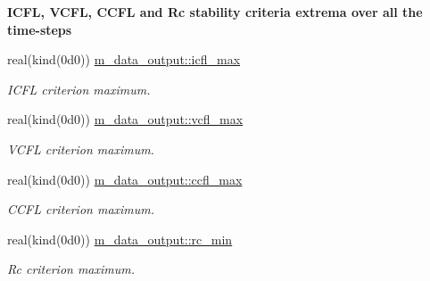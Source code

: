 \begin{Indent}\textbf{ I\+C\+FL, V\+C\+FL, C\+C\+FL and Rc stability criteria extrema over all the time-\/steps}\par
\begin{DoxyCompactItemize}
\item 
real(kind(0d0)) \hyperlink{namespacem__data__output_a08a5f85ca151336658398a0eccc93cb4}{m\+\_\+data\+\_\+output\+::icfl\+\_\+max}
\begin{DoxyCompactList}\small\item\em I\+C\+FL criterion maximum. \end{DoxyCompactList}\item 
real(kind(0d0)) \hyperlink{namespacem__data__output_ada9b22b5a158b2ce980f43cec00a1ac6}{m\+\_\+data\+\_\+output\+::vcfl\+\_\+max}
\begin{DoxyCompactList}\small\item\em V\+C\+FL criterion maximum. \end{DoxyCompactList}\item 
real(kind(0d0)) \hyperlink{namespacem__data__output_afc429263f629a2ba4b5655dec5fd2509}{m\+\_\+data\+\_\+output\+::ccfl\+\_\+max}
\begin{DoxyCompactList}\small\item\em C\+C\+FL criterion maximum. \end{DoxyCompactList}\item 
real(kind(0d0)) \hyperlink{namespacem__data__output_adb7a215382fddf4e405b97cd2f1ddf0d}{m\+\_\+data\+\_\+output\+::rc\+\_\+min}
\begin{DoxyCompactList}\small\item\em Rc criterion maximum. \end{DoxyCompactList}\end{DoxyCompactItemize}
\end{Indent}
\textbf{ }\par
